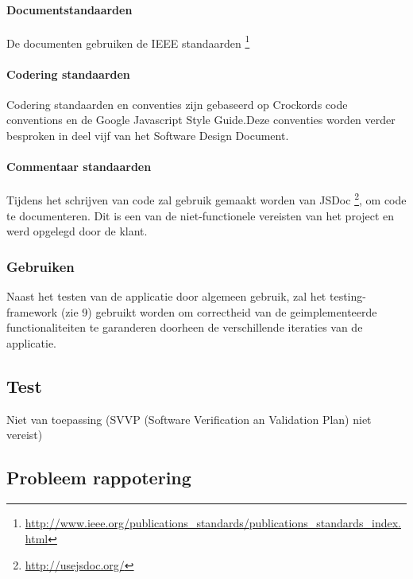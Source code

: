 \paragraph {Documentstandaarden}
De documenten gebruiken de IEEE standaarden  \footnote{\url{http://www.ieee.org/publications_standards/publications_standards_index.html}}

\paragraph{Codering standaarden}

Codering standaarden en conventies zijn gebaseerd op Crockords code conventions en de Google Javascript Style Guide.Deze conventies worden verder besproken in deel vijf van het Software Design Document.

\paragraph{Commentaar standaarden}

Tijdens het schrijven van code zal gebruik gemaakt worden van JSDoc \footnote{\url{http://usejsdoc.org/}}, om code te documenteren. Dit is een van de niet-functionele vereisten van het project en werd opgelegd door de klant.

\subsubsection{Gebruiken}

Naast het testen van de applicatie door algemeen gebruik, zal het testing-framework (zie 9) gebruikt worden om correctheid van de geimplementeerde functionaliteiten te garanderen doorheen de verschillende iteraties van de applicatie. 



\subsection{Test}
Niet van toepassing (SVVP (Software Verification an Validation Plan) niet vereist)


\subsection{Probleem rappotering}


